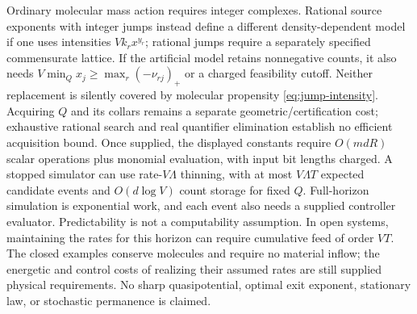 Ordinary molecular mass action requires integer complexes. Rational
source exponents with integer jumps instead define a different
density-dependent model if one uses intensities $Vk_rx^{y_r}$;
rational jumps require a separately specified commensurate lattice.
If the artificial model retains nonnegative counts, it also needs
$V\min_Qx_j\ge\max_r(-\nu_{rj})_+$ or a charged feasibility cutoff.
Neither replacement is silently covered by molecular propensity
\eqref{eq:jump-intensity}. Acquiring $Q$ and its collars remains a
separate geometric/certification cost; exhaustive rational search and
real quantifier elimination establish no efficient acquisition bound.
Once supplied, the displayed constants require $O(mdR)$ scalar
operations plus monomial evaluation, with input bit lengths charged.
A stopped simulator can use rate-$V\Lambda$ thinning, with at most
$V\Lambda T$ expected candidate events and $O(d\log V)$ count storage
for fixed $Q$. Full-horizon simulation is exponential work, and each
event also needs a supplied controller evaluator. Predictability is
not a computability assumption. In open systems, maintaining the
rates for this horizon can require cumulative feed of order $VT$.
The closed examples conserve molecules and require no material inflow;
the energetic and control costs of realizing their assumed rates
are still supplied physical requirements. No sharp quasipotential,
optimal exit exponent, stationary law, or stochastic permanence is
claimed.
